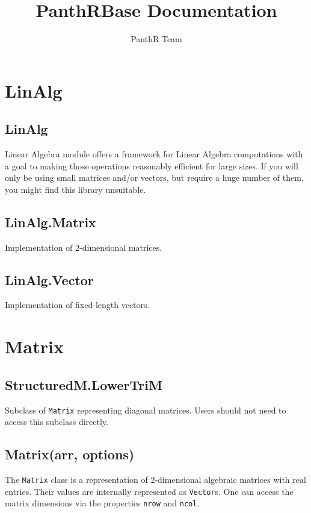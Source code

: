 \documentclass{article}
\title{PanthRBase Documentation}
\author{PanthR Team}
\begin{document}
\maketitle

\tableofcontents

  \section{LinAlg}
    \subsection*{LinAlg}
    Linear Algebra module offers a framework for Linear Algebra computations
with a goal to making those operations reasonably efficient for large sizes.
If you will only be using small matrices and/or vectors, but require a huge
number of them, you might find this library unsuitable.


    \subsection*{LinAlg.Matrix}
    Implementation of 2-dimensional matrices.


    \subsection*{LinAlg.Vector}
    Implementation of fixed-length vectors.


  \section{Matrix}
    \subsection*{StructuredM.LowerTriM}
    Subclass of \texttt{Matrix} representing diagonal matrices.
Users should not need to access this subclass directly.


    \subsection*{Matrix(arr, options)}
    The \texttt{Matrix} class is a representation of 2-dimensional algebraic matrices
with real entries. Their values are internally represented as \texttt{Vector}s.
One can access the matrix dimensions via the properties \texttt{nrow} and \texttt{ncol}.
\end{document}
